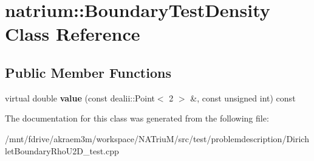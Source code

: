 \hypertarget{classnatrium_1_1BoundaryTestDensity}{
\section{natrium::BoundaryTestDensity Class Reference}
\label{classnatrium_1_1BoundaryTestDensity}
}
\subsection*{Public Member Functions}
\begin{DoxyCompactItemize}
\item 
\hypertarget{classnatrium_1_1BoundaryTestDensity_af485f34989fac863e20d1827f379cfa6}{
virtual double {\bfseries value} (const dealii::Point$<$ 2 $>$ \&, const unsigned int) const }
\label{classnatrium_1_1BoundaryTestDensity_af485f34989fac863e20d1827f379cfa6}

\end{DoxyCompactItemize}


The documentation for this class was generated from the following file:\begin{DoxyCompactItemize}
\item 
/mnt/fdrive/akraem3m/workspace/NATriuM/src/test/problemdescription/DirichletBoundaryRhoU2D\_\-test.cpp\end{DoxyCompactItemize}
